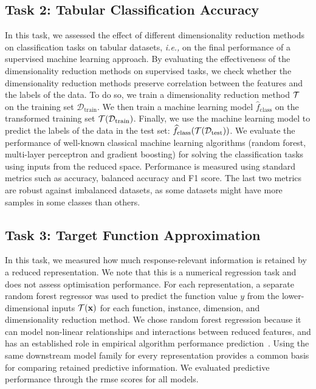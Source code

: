 \subsection{Task 2: Tabular Classification Accuracy}
\label{sec:ch05:method-ml-task2}
In this task, we assessed the effect of
different dimensionality reduction methods on classification tasks on tabular datasets, \emph{i.e.,} on the final performance of a supervised machine learning approach.
By evaluating the effectiveness of the dimensionality reduction methods on supervised tasks, we check whether the dimensionality reduction methods preserve correlation between the features and the labels of the data.
To do so, we train a dimensionality reduction method $\mathcal{T}$ on the training set $\mathcal{D}_{\text{train}}$. We then train a machine learning model $\widehat f_{\mathrm{class}}$ on the transformed training set $\mathcal{T}(\mathcal{D}_{\text{train}})$. Finally, we use the machine learning model to predict the labels of the data in the test set: $\widehat f_{\mathrm{class}}(\mathcal{T}(\mathcal{D}_{\text{test}}))$.
We evaluate the performance of well-known classical machine learning algorithms (random forest, multi-layer perceptron and gradient boosting) for solving the classification tasks using inputs from the reduced space.
Performance is measured using standard metrics such as accuracy, balanced accuracy and F1 score. The last two metrics are robust against imbalanced datasets, as some datasets might have more samples in some classes than others.

\FloatBarrier
\subsection{Task 3: Target Function Approximation}
\label{sec:ch05:method-bbo-task2}

In this task, we measured how much response-relevant information is retained by a reduced representation. We note that this is a numerical regression task and does not assess optimisation performance.
For each representation, a separate random forest regressor was used to predict the function value $y$ from the lower-dimensional inputs $\mathcal{T}(\mathbf{x})$ for each function, instance, dimension, and dimensionality reduction method.
We chose random forest regression because it can model non-linear relationships and interactions between reduced features, and has an established role in empirical algorithm performance prediction~\citep{HutEtAl14}. Using the same downstream model family for every representation provides a common basis for comparing retained predictive information.
We evaluated predictive performance through the \gls{rmse} scores for all models.

